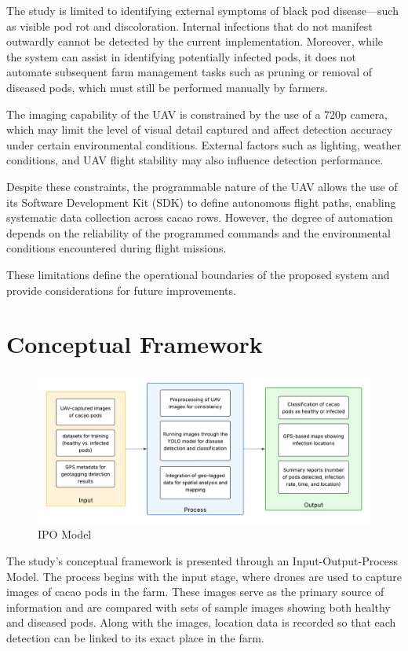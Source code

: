 {The study is limited to identifying external symptoms of black pod disease—such as visible pod rot and discoloration. Internal infections that do not manifest outwardly cannot be detected by the current implementation. Moreover, while the system can assist in identifying potentially infected pods, it does not automate subsequent farm management tasks such as pruning or removal of diseased pods, which must still be performed manually by farmers.

The imaging capability of the UAV is constrained by the use of a 720p camera, which may limit the level of visual detail captured and affect detection accuracy under certain environmental conditions. External factors such as lighting, weather conditions, and UAV flight stability may also influence detection performance.

Despite these constraints, the programmable nature of the UAV allows the use of its Software Development Kit (SDK) to define autonomous flight paths, enabling systematic data collection across cacao rows. However, the degree of automation depends on the reliability of the programmed commands and the environmental conditions encountered during flight missions.

These limitations define the operational boundaries of the proposed system and provide considerations for future improvements.

\section{Conceptual Framework}

\begin{figure}[H]
	\centering
  \caption{IPO Model}
	\label{fig:ipo}
	\includegraphics[width=1\textwidth]{figures/IPO.pdf}
\end{figure}

The study's conceptual framework is presented through an Input-Output-Process Model. The process begins with the input stage, where drones are used to capture images of cacao pods in the farm. These images serve as the primary source of information and are compared with sets of sample images showing both healthy and diseased pods. Along with the images, location data is recorded so that each detection can be linked to its exact place in the farm. 

}
